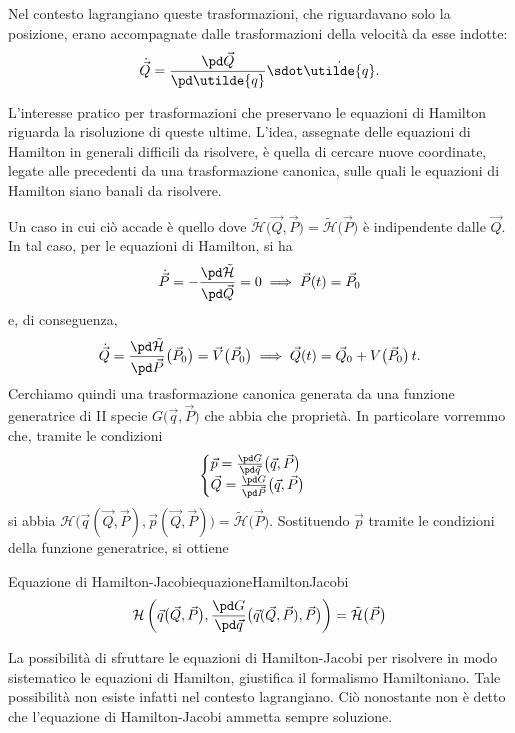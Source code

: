 \begin{oss}
	Nel contesto lagrangiano queste trasformazioni, che riguardavano solo la posizione, erano accompagnate dalle trasformazioni della velocità da esse indotte:
	\[
		\dot{\vec{Q}} = \frac{\pd\vec{Q}}{\pd\utilde{q}}\sdot \dot{\utilde{q}}.
	\]
\end{oss}

L'interesse pratico per trasformazioni che preservano le equazioni di Hamilton riguarda la risoluzione di queste ultime.
L'idea, assegnate delle equazioni di Hamilton in generali difficili da risolvere, è quella di cercare nuove coordinate, legate alle precedenti da una trasformazione canonica, sulle quali le equazioni di Hamilton siano banali da risolvere.

Un caso in cui ciò accade è quello dove \(\tilde{\mathcal{H}}\big(\vec{Q},\vec{P}\big)=\tilde{\mathcal{H}}\big(\vec{P}\big)\) è indipendente dalle \(\vec{Q}\). In tal caso, per le equazioni di Hamilton, si ha
\[
	\dot{\vec{P}} = -\frac{\pd\tilde{\mathcal{H}}}{\pd\vec{Q}} = 0 \implies \vec{P}(t) = \vec{P}_0
\]
e, di conseguenza,
\[
	\dot{\vec{Q}} = \frac{\pd\tilde{\mathcal{H}}}{\pd\vec{P}}\big(\vec{P}_0\big) = \vec{V}\big(\vec{P}_0\big) \implies \vec{Q}(t) = \vec{Q}_0 + V\big(\vec{P}_0\big)\,t.
\]
Cerchiamo quindi una trasformazione canonica generata da una funzione generatrice di II specie \(G\big(\vec{q},\vec{P}\big)\) che abbia che proprietà. In particolare vorremmo che, tramite le condizioni
\[
	\begin{cases}
		\vec{p} = \frac{\pd G}{\pd\vec{q}}\big(\vec{q},\vec{P}\big) \\
		\vec{Q} = \frac{\pd G}{\pd\vec{P}}\big(\vec{q},\vec{P}\big)
	\end{cases}
\]
si abbia \(\mathcal{H}\big(\vec{q}(\vec{Q},\vec{P}),\vec{p}(\vec{Q},\vec{P})\big) = \tilde{\mathcal{H}}\big(\vec{P}\big)\).
Sostituendo \(\vec{p}\) tramite le condizioni della funzione generatrice, si ottiene

\begin{remark}{Equazione di Hamilton-Jacobi}{equazioneHamiltonJacobi}
	\[
		\mathcal{H}\left(\vec{q}\big(\vec{Q},\vec{P}\big), \frac{\pd G}{\pd\vec{q}}\big(\vec{q}(\vec{Q},\vec{P}),\vec{P}\big)\right) = \tilde{\mathcal{H}}\big(\vec{P}\big)
	\]
\end{remark}

\begin{oss}
	La possibilità di sfruttare le equazioni di Hamilton-Jacobi per risolvere in modo sistematico le equazioni di Hamilton, giustifica il formalismo Hamiltoniano. Tale possibilità non esiste infatti nel contesto lagrangiano.
	Ciò nonostante non è detto che l'equazione di Hamilton-Jacobi ammetta sempre soluzione.
\end{oss}

